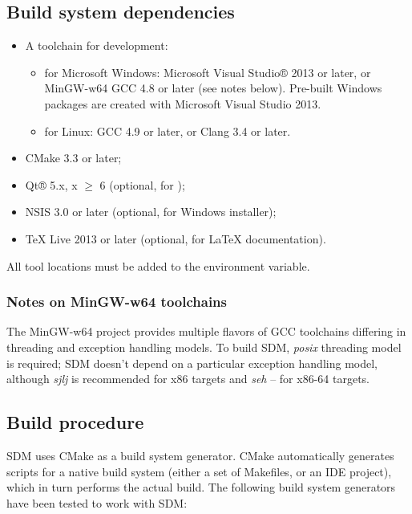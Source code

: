 \documentclass[a4paper,12pt,twoside,extrafontsizes]{memoir}
\begin{document}
\subsection{Build system dependencies}
\label{subsec:dependencies}

\begin{itemize}
	\item A toolchain for \cplusplus{} development:
		\begin{itemize}
			\item for Microsoft Windows: Microsoft Visual Studio® 2013 or later, or MinGW-w64 GCC 4.8 or later (see notes below). Pre-built Windows packages are created with Microsoft Visual Studio 2013.
			\item for Linux: GCC 4.9 or later, or Clang 3.4 or later.
		\end{itemize}
	\item CMake 3.3 or later;
	\item Qt® 5.x, x $\ge$ 6 (optional, for );
	\item NSIS 3.0 or later (optional, for Windows installer);
	\item TeX Live 2013 or later (optional, for \LaTeX{} documentation).
\end{itemize}

All tool locations must be added to the  environment variable.

\subsubsection{Notes on MinGW-w64 toolchains}

The MinGW-w64 project provides multiple flavors of GCC toolchains differing in threading and exception handling models. To build SDM, \emph{posix} threading model is required; SDM doesn't depend on a particular exception handling model, although \emph{sjlj} is recommended for x86 targets and \emph{seh} -- for x86-64 targets.

\subsection{Build procedure}

SDM uses CMake as a build system generator. CMake automatically generates scripts for a native build system (either a set of Makefiles, or an IDE project), which in turn performs the actual build. The following build system generators have been tested to work with SDM:
\end{document}
